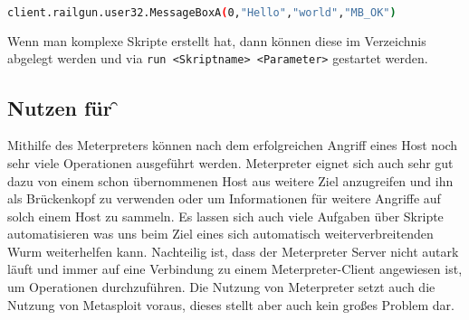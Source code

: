 \begin{lstlisting}[language=bash]
  client.railgun.user32.MessageBoxA(0,"Hello","world","MB_OK")
\end{lstlisting}

Wenn man komplexe Skripte erstellt hat, dann können diese im Verzeichnis
 abgelegt werden und via \texttt{run <Skriptname>
<Parameter>} gestartet werden.


\subsection{Nutzen für \f}

Mithilfe des Meterpreters können nach dem erfolgreichen Angriff eines
Host noch sehr viele Operationen ausgeführt werden. Meterpreter eignet
sich auch sehr gut dazu von einem schon übernommenen Host aus weitere
Ziel anzugreifen und ihn als Brückenkopf zu verwenden oder um
Informationen für weitere Angriffe auf solch einem Host zu sammeln.
Es lassen sich auch viele Aufgaben über Skripte automatisieren was uns
beim Ziel eines sich automatisch weiterverbreitenden Wurm weiterhelfen
kann. Nachteilig ist, dass der Meterpreter Server nicht autark läuft und
immer auf eine Verbindung zu einem Meterpreter-Client angewiesen ist, um
Operationen durchzuführen. Die Nutzung von Meterpreter setzt auch die
Nutzung von Metasploit voraus, dieses stellt aber auch kein großes
Problem dar.
